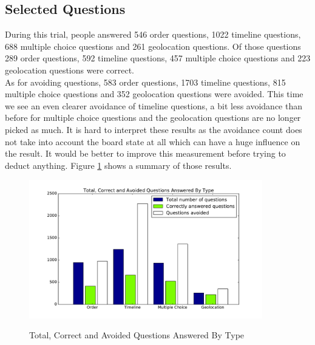 \subsection{Selected Questions}
During this trial, people answered 546 order questions, 1022 timeline questions, 688 multiple choice questions and 261 geolocation questions. Of those questions 289 order questions, 592 timeline questions, 457 multiple choice questions and 223 geolocation questions were correct.\\
As for avoiding questions, 583 order questions, 1703 timeline questions, 815 multiple choice questions and 352 geolocation questions were avoided. This time we see an even clearer avoidance of timeline questions, a bit less avoidance than before for multiple choice questions and the geolocation questions are no longer picked as much. It is hard to interpret these results as the avoidance count does not take into account the board state at all which can have a huge influence on the result. It would be better to improve this measurement before trying to deduct anything. Figure \ref{fig:p2TotCorrectAvoid} shows a summary of those results.
\begin{figure}
\centering
{\includegraphics[width=4in]{images/pilot_2_selected_questions.pdf}}
\caption{Total, Correct and Avoided Questions Answered By Type}
\label{fig:p2TotCorrectAvoid}
\end{figure}
